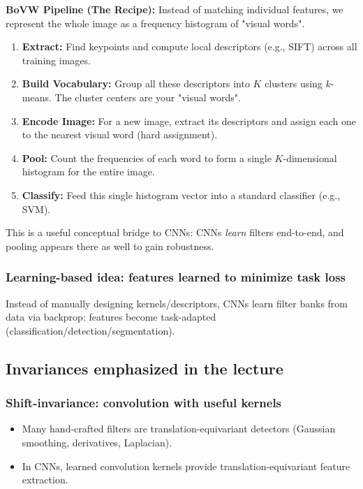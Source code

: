 \documentclass[11pt,a4paper]{article}
\begin{document}
\begin{mathrule}
\textbf{BoVW Pipeline (The Recipe):}
Instead of matching individual features, we represent the whole image as a frequency histogram of "visual words".
\begin{enumerate}
  \item \textbf{Extract:} Find keypoints and compute local descriptors (e.g., SIFT) across all training images.
  \item \textbf{Build Vocabulary:} Group all these descriptors into $K$ clusters using $k$-means. The cluster centers are your "visual words".
  \item \textbf{Encode Image:} For a new image, extract its descriptors and assign each one to the nearest visual word (hard assignment).
  \item \textbf{Pool:} Count the frequencies of each word to form a single $K$-dimensional histogram for the entire image.
  \item \textbf{Classify:} Feed this single histogram vector into a standard classifier (e.g., SVM).
\end{enumerate}
\end{mathrule}

\begin{intbox}
This is a useful conceptual bridge to CNNs:
CNNs \emph{learn} filters end-to-end, and pooling appears there as well to gain robustness.
\end{intbox}

\subsubsection{Learning-based idea: features learned to minimize task loss}
Instead of manually designing kernels/descriptors, CNNs learn filter banks from data via backprop:
features become task-adapted (classification/detection/segmentation).

\subsection{Invariances emphasized in the lecture}
\subsubsection{Shift-invariance: convolution with useful kernels}
\begin{itemize}
  \item Many hand-crafted filters are translation-equivariant detectors (Gaussian smoothing, derivatives, Laplacian).
  \item In CNNs, learned convolution kernels provide translation-equivariant feature extraction.
\end{itemize}
\end{document}
